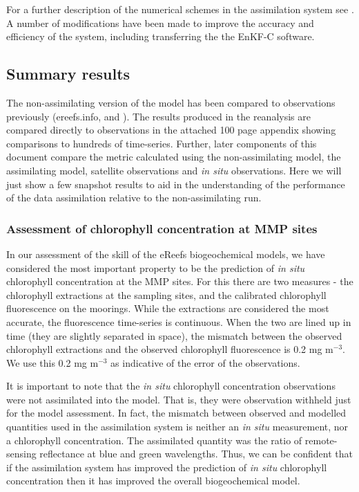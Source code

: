 \documentclass{elsart}
\begin{document}
For a further description of the numerical schemes in the assimilation system see \citep{Jones16}. A number of modifications have been made to improve the accuracy and efficiency of the system, including transferring the the EnKF-C software.

\subsection{Summary results} 

The non-assimilating version of the model has been compared to observations previously (ereefs.info, \citet{Baird16a} and \citet{Skerratt18}). The results produced in the reanalysis are compared directly to observations in the attached 100 page appendix showing comparisons to hundreds of time-series. Further, later components of this document compare the metric calculated using the non-assimilating model, the assimilating model, satellite observations and \textit{in situ} observations. Here we will just show a few snapshot results to aid in the understanding of the performance of the data assimilation relative to the non-assimilating run.

\subsubsection{Assessment of chlorophyll concentration at MMP sites}

In our assessment of the skill of the eReefs biogeochemical models, we have considered the most important property to be the prediction of \textit{in situ} chlorophyll concentration at the MMP sites. For this there are two measures - the chlorophyll extractions at the sampling sites, and the calibrated chlorophyll fluorescence on the moorings.  While the extractions are considered the most accurate, the fluorescence time-series is continuous. When the two are lined up in time (they are slightly separated in space), the mismatch between the observed chlorophyll extractions and the observed chlorophyll fluorescence is 0.2 mg m$^{-3}$. We use this 0.2 mg m$^{-3}$ as indicative of the error of the observations. 

It is important to note that the \textit{in situ} chlorophyll concentration observations were not assimilated into the model. That is, they were observation withheld just for the model assessment. In fact, the mismatch between observed and modelled quantities used in the assimilation system is neither an \textit{in situ} measurement, nor a chlorophyll concentration. The assimilated quantity was the ratio of remote-sensing reflectance at blue and green wavelengths. Thus, we can be confident that if the assimilation system has improved the prediction of \textit{in situ} chlorophyll concentration then it has improved the overall biogeochemical model.
\end{document}
